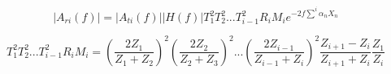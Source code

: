$$|{A_{ri}}(f)| = |{A_{ti}}(f)||H(f)|T_1^2T_2^2...T_{i - 1}^2{R_i}{M_i}{e^{ - 2f\sum\limits_{}^i {{\alpha _n}{X_n}} }} $$



$$T_1^2T_2^2...T_{i - 1}^2{R_i}{M_i} = {\left( {\frac{{2{Z_1}}}{{{Z_1} + {Z_2}}}} \right)^2}{\left( {\frac{{2{Z_2}}}{{{Z_2} + {Z_3}}}} \right)^2}...{\left( {\frac{{2{Z_{i - 1}}}}{{{Z_{i - 1}} + {Z_i}}}} \right)^2}\frac{{{Z_{i + 1}} - {Z_i}}}{{{Z_{i + 1}} + {Z_i}}}\frac{{{Z_1}}}{{{Z_i}}}$$


